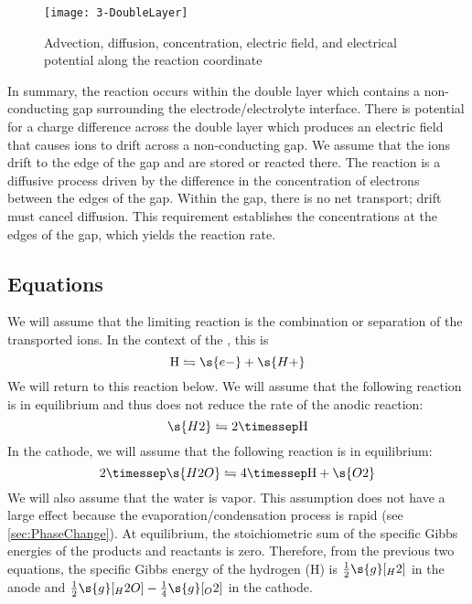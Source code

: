 \begin{figure}[htbp]
  \texttt{[image: 3-DoubleLayer]}%
  \caption[Advection, diffusion, and properties along the reaction coordinate]{Advection, diffusion, concentration, electric field, and electrical potential along the reaction coordinate}%
  \label{fig:DoubleLayer}
\end{figure}

In summary, the reaction occurs within the double layer which contains a non-conducting gap surrounding the electrode\slash{}electrolyte interface.  There is potential for a charge difference across the double layer which produces an electric field that causes ions to drift across a non-conducting gap.  We assume that the ions drift to the edge of the gap and are stored or reacted there.  The reaction is a diffusive process driven by the difference in the concentration of electrons between the edges of the gap.  Within the gap, there is no net transport; drift must cancel diffusion.  This requirement establishes the concentrations at the edges of the gap, which yields the reaction rate.


\subsection{Equations}

We will assume that the limiting reaction is the combination or separation of the transported ions.  In the context of the , this is
\begin{equation}
  \mathrm{H} \leftrightharpoons \s{e-} + \s{H+}
\end{equation}
We will return to this reaction below.  We will assume that the following reaction is in equilibrium and thus does not reduce the rate of the anodic reaction:
\begin{equation}
  \label{eq:AnChemical}
  \s{H2} \leftrightharpoons 2\timessep\mathrm{H}
\end{equation}
In the cathode, we will assume that the following reaction is in equilibrium:
\begin{equation}
  \label{eq:CaChemical}
  2\timessep\s{H2O} \leftrightharpoons 4\timessep\mathrm{H} + \s{O2}
\end{equation}
We will also assume that the water is vapor.  This assumption does not have a large effect because the evaporation\slash{}condensation process is rapid (see \autoref{sec:PhaseChange}).  At equilibrium, the stoichiometric sum of the specific Gibbs energies of the products and reactants is zero.  Therefore, from the previous two equations, the specific Gibbs energy of the hydrogen (H) is $\frac{1}{2}\s{g}[_H2]$ in the anode and $\frac{1}{2}\s{g}[_H2O] - \frac{1}{4}\s{g}[_O2]$ in the cathode.  

